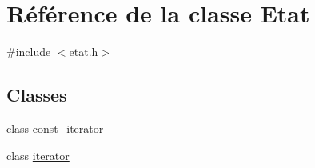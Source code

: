 \hypertarget{class_etat}{}\section{Référence de la classe Etat}
\label{class_etat}


{\ttfamily \#include $<$etat.\+h$>$}

\subsection*{Classes}
\begin{DoxyCompactItemize}
\item 
class \mbox{\hyperlink{class_etat_1_1const__iterator}{const\+\_\+iterator}}
\item 
class \mbox{\hyperlink{class_etat_1_1iterator}{iterator}}
\end{DoxyCompactItemize}
